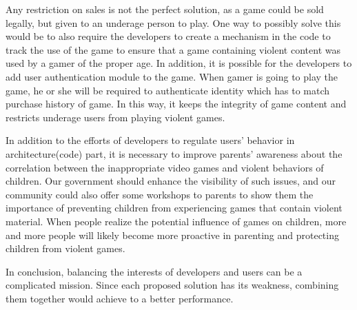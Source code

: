 \textcolor{ProcessBlue}{Any restriction on sales is not the perfect solution, as a game could be sold legally, but given to an underage person to play.} One way to possibly solve this would be to also require the developers to create a mechanism in the code to track the use of the game to ensure that a game containing violent content was used by a gamer of the proper age. In addition, it is possible for the developers to add user authentication module to the game. When gamer is going to play the game, he or she will be required to authenticate identity which has to match purchase history of game. In this way, it keeps the integrity of game content and restricts underage users from playing violent games.

In addition to the efforts of developers to regulate users' behavior in architecture(code) part, it is necessary to improve parents' awareness about the correlation between the inappropriate video games and violent behaviors of children. Our government should enhance the visibility of such issues, and our community could also offer some workshops to parents to show them the importance of preventing children from experiencing games that contain violent material. When people realize the potential influence of games on children, more and more people will likely become more proactive in parenting and protecting children from violent games.

In conclusion, balancing the interests of developers and users can be a complicated mission. Since each proposed solution has its weakness, combining them together would achieve to a better performance. 

